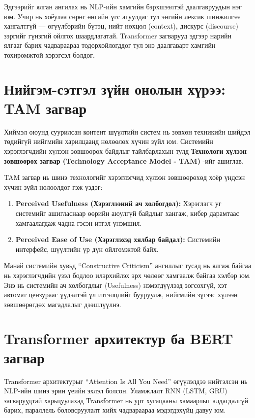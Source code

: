 Эдгээрийг ялган ангилах нь NLP-ийн хамгийн бэрхшээлтэй даалгавруудын нэг юм.
Учир нь хоёулаа сөрөг өнгийн үгс агуулдаг тул энгийн лексик шинжилгээ
хангалтгүй --- өгүүлбэрийн бүтэц, нийт нөхцөл (context), дискурс (discourse)
зэргийг гүнзгий ойлгох шаардлагатай. Transformer загварууд эдгээр нарийн
ялгааг барих чадвараараа тодорхойлогддог тул энэ даалгаварт хамгийн тохиромжтой
хэрэгсэл болдог.

\section{Нийгэм-сэтгэл зүйн онолын хүрээ: TAM загвар}

Хиймэл оюунд суурилсан контент шүүлтийн систем нь зөвхөн техникийн шийдэл
төдийгүй нийгмийн харилцаанд нөлөөлөх хүчин зүйл юм. Системийн хэрэглэгчдийн
хүлээн зөвшөөрөх байдлыг тайлбарлахын тулд \textbf{Технологи хүлээн зөвшөөрөх
загвар (Technology Acceptance Model - TAM)} \cite{davis1989}-ийг ашиглав.

TAM загвар нь шинэ технологийг хэрэглэгчид хүлээн зөвшөөрөхөд хоёр үндсэн
хүчин зүйл нөлөөлдөг гэж үздэг:
\begin{enumerate}
    \item \textbf{Perceived Usefulness (Хэрэглээний ач холбогдол):} Хэрэглэгч уг
    системийг ашигласнаар өөрийн аюулгүй байдлыг хангаж, кибер дарамтаас
    хамгаалагдаж чадна гэсэн итгэл үнэмшил.
    \item \textbf{Perceived Ease of Use (Хэрэглэхэд хялбар байдал):} Системийн
    интерфейс, шүүлтийн үр дүн ойлгомжтой байх.
\end{enumerate}

Манай системийн хувьд ``Constructive Criticism'' ангиллыг тусад нь ялгаж байгаа
нь хэрэглэгчдийн үзэл бодлоо илэрхийлэх эрх чөлөөг хамгаалж байгаа хэлбэр юм.
Энэ нь системийн ач холбогдлыг (Usefulness) нэмэгдүүлээд зогсохгүй, хэт
автомат цензураас үүдэлтэй үл итгэлцлийг бууруулж, нийгмийн зүгээс хүлээн
зөвшөөрөгдөх магадлалыг дээшлүүлнэ.

\section{Transformer архитектур ба BERT загвар}
\label{sec:transformer}

Transformer архитектурыг \cite{vaswani2017} ``Attention Is All You Need''
өгүүлэлдээ нийтэлсэн нь NLP-ийн шинэ эрин үеийн эхлэл болсон. Уламжлалт
RNN (LSTM, GRU) загваруудтай харьцуулахад Transformer нь урт хугацааны
хамаарлыг алдагдалгүй барих, параллель боловсруулалт хийх чадвараараа
мэдэгдэхүйц давуу юм.

